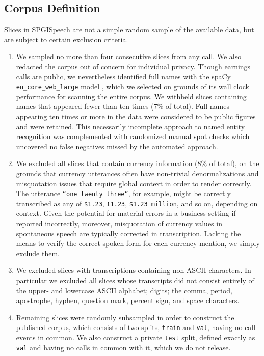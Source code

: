 \documentclass{article}
\newcommand{\corpus}{SPGISpeech}
\begin{document}
\subsection{Corpus Definition}


Slices in \corpus{} are not a simple random sample of the available data, but are subject to certain exclusion criteria.
\begin{enumerate}
\item We sampled no more than four consecutive slices from any call.
We also redacted the corpus out of concern for individual privacy.
Though earnings calls are public, we nevertheless identified full
names with the spaCy \texttt{en\_core\_web\_large} model
\cite{honnibal17}, which we selected on grounds of its wall clock
performance for scanning the entire corpus.  We withheld slices
containing names that appeared fewer than ten times (7\% of total).
Full names appearing ten times or more in the data were considered to
be public figures and were retained.  This necessarily incomplete
approach to named entity recognition was complemented with randomized
manual spot checks which uncovered no false negatives missed by the
automated approach.

\item We excluded all slices that contain currency information (8\% of
total), on the grounds that currency utterances often have non-trivial
denormalizations and misquotation issues that require global context
in order to render correctly.  The utterance \texttt{``one twenty
  three''}, for example, might be correctly transcribed as any of
\texttt{\$1.23}, \texttt{\pounds 1.23}, \texttt{\$1.23 million}, and
so on, depending on context.  Given the potential for material errors
in a business setting if reported incorrectly, moreover, misquotation of
currency values in spontaneous speech are typically corrected in
transcription.  Lacking the means to verify the correct spoken form
for each currency mention, we simply exclude them.


\item We excluded slices with transcriptions containing non-ASCII
characters.  
In particular we excluded all slices whose
transcripts did not consist entirely of the upper- and lowercase ASCII
alphabet; digits; the comma, period, apostrophe, hyphen, question
mark, percent sign, and space characters.

\item Remaining slices were randomly subsampled in order to construct
the published corpus, which consists of two splits, \texttt{train}
and \texttt{val}, having no call events in common.  We also construct a private \texttt{test} split, defined exactly as \texttt{val} and having no calls in common with it, which we do not release.
\end{enumerate}
\end{document}
